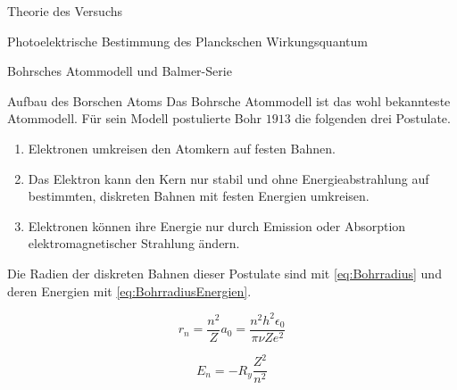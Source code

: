 \documentclass[pdftex, a4paper,11pt, twoside, ngerman]{report}
\begin{document}
\begin{chapter}{Theorie des Versuchs}
\begin{section}{Photoelektrische Bestimmung des Planckschen Wirkungsquantum}
      
    \end{section}
    
    
    
    \begin{section}{Bohrsches Atommodell und Balmer-Serie}
      \label{chp:TheorieBohrBalmerSerie}
      
      
      
      \begin{subsection}{Aufbau des Borschen Atoms}
        \label{chp:TheorieBohrBalmerSerieAufbauAtomhuelle}
        Das Bohrsche Atommodell ist das wohl bekannteste Atommodell. Für sein Modell postulierte Bohr $1913$ die folgenden drei Postulate.
        \begin{enumerate}
          \item Elektronen umkreisen den Atomkern auf festen Bahnen.
          \item Das Elektron kann den Kern nur stabil und ohne Energieabstrahlung auf bestimmten, diskreten Bahnen mit festen Energien umkreisen.
          \item Elektronen können ihre Energie nur durch Emission oder Absorption elektromagnetischer Strahlung ändern.
        \end{enumerate}
        Die Radien der diskreten Bahnen dieser Postulate sind mit \cref{eq:Bohrradius} und deren Energien mit \cref{eq:BohrradiusEnergien}.
        \newline
        \begin{minipage}{.48\textwidth}
          \begin{equation}
            \label{eq:Bohrradius}
            r_{n}=\frac{n^{2}}{Z}a_{0}=\frac{n^{2}h^{2}\epsilon_{0}}{\pi\nu Ze^{2}}
          \end{equation}
        \end{minipage}
        \begin{minipage}{.48\textwidth}
          \begin{equation}
            \label{eq:BohrradiusEnergien}
            E_{n}=-R_{y}\frac{Z^{2}}{n^{2}}
          \end{equation}
        \end{minipage}
        

\end{subsection}
\end{section}
\end{chapter}
\end{document}
